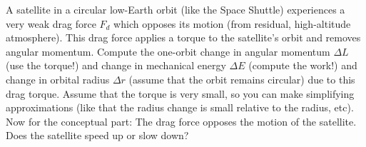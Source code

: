 \documentclass[12pt]{article}
\begin{document}
A satellite in a circular low-Earth orbit (like the Space Shuttle)
experiences a very weak drag force $F_d$ which opposes its motion
(from residual, high-altitude atmosphere).  This drag force applies a
torque to the satellite's orbit and removes angular momentum.  Compute
the one-orbit change in angular momentum $\Delta L$ (use the torque!)
and change in mechanical energy $\Delta E$ (compute the work!) and
change in orbital radius $\Delta r$ (assume that the orbit remains
circular) due to this drag torque.  Assume that the torque is very
small, so you can make simplifying approximations (like that the
radius change is small relative to the radius, etc).  Now for the
conceptual part: The drag force opposes the motion of the satellite.
Does the satellite speed up or slow down?
\end{document}
